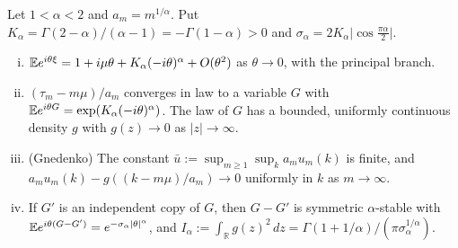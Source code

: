 \begin{lemma}\label{lem:stable}
Let $1<\alpha<2$ and $a_m=m^{1/\alpha}$. Put
$K_\alpha=\Gamma(2-\alpha)/(\alpha-1)=-\Gamma(1-\alpha)>0$ and
$\sigma_\alpha=2K_\alpha\lvert\cos\frac{\pi\alpha}2\rvert$.
\begin{enumerate}[(i)]
\item $\mathbb{E} e^{i\theta\xi}=1+i\mu\theta+K_\alpha(-i\theta)^\alpha+O(\theta^2)$
as $\theta\to0$, with the principal branch.
\item $(\tau_m-m\mu)/a_m$ converges in law to a variable $G$ with
$\mathbb{E} e^{i\theta G}=\exp(K_\alpha(-i\theta)^\alpha)$. The law of $G$ has a
bounded, uniformly continuous density $g$ with $g(z)\to0$ as
$\lvert z\rvert\to\infty$.
\item (Gnedenko) The constant $\bar u:=\sup_{m\ge1}\sup_ka_mu_m(k)$ is
finite, and $a_mu_m(k)-g((k-m\mu)/a_m)\to0$ uniformly in $k$ as
$m\to\infty$.
\item If $G'$ is an independent copy of $G$, then $G-G'$ is symmetric
$\alpha$-stable with $\mathbb{E} e^{i\theta(G-G')}=e^{-\sigma_\alpha\lvert
\theta\rvert^\alpha}$, and
$I_\alpha:=\int_{\mathbb R}g(z)^2\,dz=\Gamma(1+1/\alpha)/(\pi\sigma_\alpha^{1/\alpha})$.
\end{enumerate}
\end{lemma}

